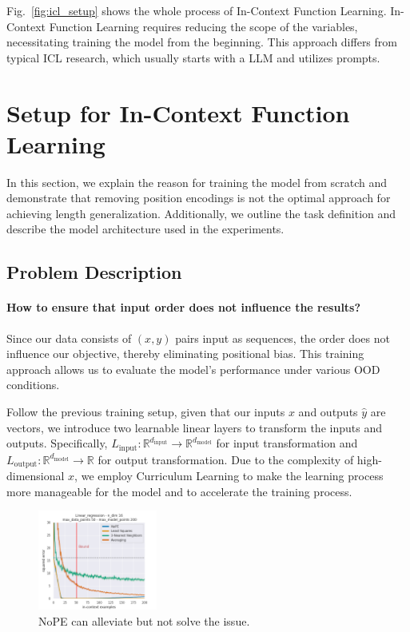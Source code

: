 \documentclass[letterpaper]{article} %
\begin{document}
Fig.~\ref{fig:icl_setup} shows the whole process of In-Context Function Learning. In-Context Function Learning requires reducing the scope of the variables, necessitating training the model from the beginning. This approach differs from typical ICL research, which usually starts with a LLM and utilizes prompts.

\section{Setup for In-Context Function Learning}
In this section, we explain the reason for training the model from scratch and demonstrate that removing position encodings is not the optimal approach for achieving length generalization. Additionally, we outline the task definition and describe the model architecture used in the experiments.

\subsection{Problem Description}
\paragraph{How to ensure that input order does not influence the results?}
Since our data consists of $(x, y)$ pairs input as sequences, the order does not influence our objective, thereby eliminating positional bias. This training approach allows us to evaluate the model's performance under various OOD conditions.

Follow the previous training setup, given that our inputs $x$ and outputs $\hat{y}$ are vectors, we introduce two learnable linear layers to transform the inputs and outputs. Specifically, $L_{\text{input}}: \mathbb{R}^{d_{\text{input}}} \to \mathbb{R}^{d_{\text{model}}}$ for input transformation and $L_{\text{output}}: \mathbb{R}^{d_{\text{model}}} \to \mathbb{R}$ for output transformation. Due to the complexity of high-dimensional $x$, we employ Curriculum Learning \cite{bengio-2009-curriculum} to make the learning process more manageable for the model and to accelerate the training process.

\begin{figure}
    \center
    \includegraphics[width=0.35\textwidth]{AnonymousSubmission/LaTeX/imgs/nope.png}
    \caption{
        NoPE can alleviate but not solve the issue.
    }
    \label{fig:nope}
\end{figure}
\end{document}
